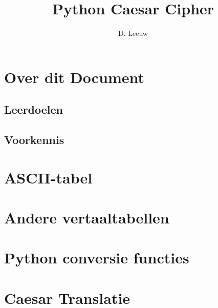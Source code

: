 \documentclass[a4paper,12pt,twoside,openright,titlepage]{article}
\author{D. Leeuw}
\title{Python Caesar Cipher}
\date{\today\\
\vfill
\raggedright
\copyright\ 2020-2025 Dennis Leeuw\\
}
\begin{document}

\maketitle


\section{Over dit Document}
\subsection{Leerdoelen}

\subsection{Voorkennis}
%



\section{ASCII-tabel}




\section{Andere vertaaltabellen}


\section{Python conversie functies}


\section{Caesar Translatie}


\printindex
\end{document}
